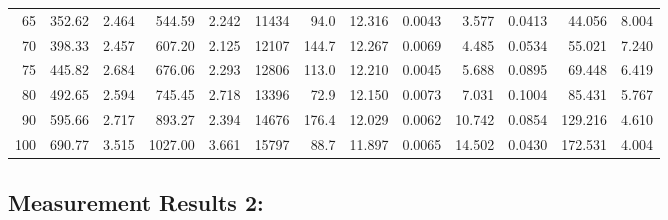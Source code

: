 \documentclass[10pt]{article}
\begin{document}
{\begin{tabular}{|r|rr|rr|rr|rr|rr|r|r|}
       65 &       352.62 &        2.464 &       544.59 &        2.242 &        11434 &         94.0 &       12.316 &       0.0043 &        3.577 &       0.0413 &       44.056 &        8.004 \\
       70 &       398.33 &        2.457 &       607.20 &        2.125 &        12107 &        144.7 &       12.267 &       0.0069 &        4.485 &       0.0534 &       55.021 &        7.240 \\
       75 &       445.82 &        2.684 &       676.06 &        2.293 &        12806 &        113.0 &       12.210 &       0.0045 &        5.688 &       0.0895 &       69.448 &        6.419 \\
       80 &       492.65 &        2.594 &       745.45 &        2.718 &        13396 &         72.9 &       12.150 &       0.0073 &        7.031 &       0.1004 &       85.431 &        5.767 \\
       90 &       595.66 &        2.717 &       893.27 &        2.394 &        14676 &        176.4 &       12.029 &       0.0062 &       10.742 &       0.0854 &      129.216 &        4.610 \\
      100 &       690.77 &        3.515 &      1027.00 &        3.661 &        15797 &         88.7 &       11.897 &       0.0065 &       14.502 &       0.0430 &      172.531 &        4.004 \\
\hline
\end{tabular}
}



\subsection*{\large \bf Measurement Results 2:}
\end{document}
